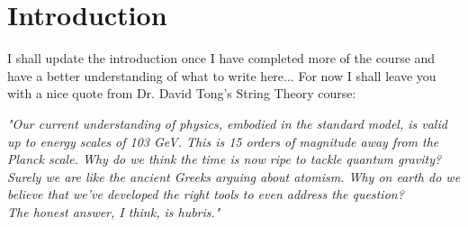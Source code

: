 \chapter{Introduction}

I shall update the introduction once I have completed more of the course and have a better understanding of what to write here... For now I shall leave you with a nice quote from Dr. David Tong's String Theory course:

\begin{center}
    \textit{
        "Our current understanding of physics, embodied in the standard model, is valid up to energy scales of 103 GeV. This is 15 orders of magnitude away from the Planck scale. Why do we think the time is now ripe to tackle quantum gravity? Surely we are like the ancient Greeks arguing about atomism. Why on earth do we believe that we've developed the right tools to even address the question?\\
        The honest answer, I think, is hubris."
    }
\end{center}

